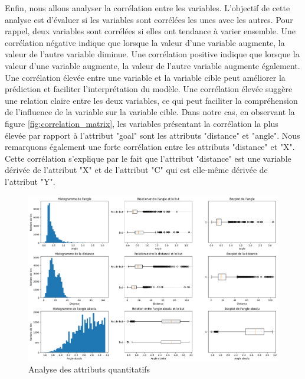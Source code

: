 \documentclass[12pt]{article}
\begin{document}
Enfin, nous allons analyser la corrélation entre les variables.
L'objectif de cette analyse est d'évaluer si les variables sont corrélées les unes avec les autres.
Pour rappel, deux variables sont corrélées si elles ont tendance à varier ensemble. 
Une corrélation négative indique que lorsque la valeur d'une variable augmente, la valeur de l'autre variable diminue. 
Une corrélation positive indique que lorsque la valeur d'une variable augmente, la valeur de l'autre variable augmente également. 
Une corrélation élevée entre une variable et la variable cible peut améliorer la prédiction et faciliter l'interprétation du modèle. 
Une corrélation élevée suggère une relation claire entre les deux variables, ce qui peut faciliter la compréhension de l'influence de la variable sur la variable cible.
\newline\newline
Dans notre cas, en observant la figure \ref{fig:correlation_matrix}, les variables présentant la corrélation la plus élevée par rapport à l'attribut "goal" sont les attributs "distance" et "angle". 
Nous remarquons également une forte corrélation entre les attributs "distance" et "X". 
Cette corrélation s'explique par le fait que l'attribut "distance" est une variable dérivée de l'attribut "X" et de l'attribut "C" qui est elle-même dérivée de l'attribut "Y".
\begin{figure}[htp]
    \centering
    \includegraphics[width=\textwidth]{img/analyseOutlier.png}
    \caption{Analyse des attributs quantitatifs}
    \label{fig:analyse_quantitative}
\end{figure}
\end{document}

